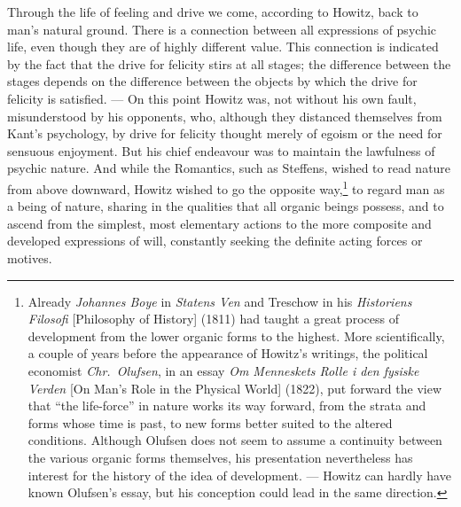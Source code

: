 \documentclass[12pt,a4paper]{book}
\newcommand{\opage}[1]{\marginnote{\footnotesize\textit{[#1]}}}
\begin{document}
Through the life of feeling and drive we come, according to Howitz, back to man's natural
ground. There is a connection between all expressions of psychic life, even though they
are of highly different value. This connection is indicated by the fact that the drive for
felicity stirs at all stages; the difference between the stages depends on the difference
between the objects by which the drive for felicity is satisfied. --- On this point Howitz
was, not without his own fault, misunderstood by his opponents, who, although they
distanced themselves from Kant's psychology, by drive for felicity thought merely of
egoism or the need for sensuous enjoyment. But his chief endeavour was to maintain \opage{85}the
lawfulness of psychic nature. And while the Romantics, such as Steffens, wished to read
nature from above downward, Howitz wished to go the opposite way,\footnote{Already \emph{Johannes
Boye} in \emph{Statens Ven} and Treschow in his \emph{Historiens Filosofi} [Philosophy of
History] (1811) had taught a great process of development from the lower organic forms to
the highest. More scientifically, a couple of years before the appearance of Howitz's
writings, the political economist \emph{Chr.\ Olufsen}, in an essay \emph{Om Menneskets Rolle i
den fysiske Verden} [On Man's Role in the Physical World] (1822), put forward the view that
``the life-force'' in nature works its way forward, from the strata and forms whose time is
past, to new forms better suited to the altered conditions. Although Olufsen does not seem
to assume a continuity between the various organic forms themselves, his presentation
nevertheless has interest for the history of the idea of development. --- Howitz can hardly
have known Olufsen's essay, but his conception could lead in the same direction.} to regard
man as a being of nature, sharing in the qualities that all organic beings possess, and to
ascend from the simplest, most elementary actions to the more composite and developed
expressions of will, constantly seeking the definite acting forces or motives.
\end{document}
